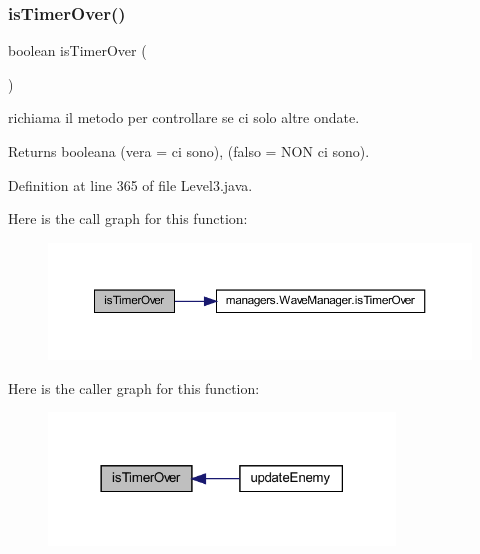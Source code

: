 \subsubsection{\texorpdfstring{is\+Timer\+Over()}{isTimerOver()}}
{\footnotesize\ttfamily boolean is\+Timer\+Over (\begin{DoxyParamCaption}{ }\end{DoxyParamCaption})\hspace{0.3cm}{\ttfamily [private]}}



richiama il metodo per controllare se ci solo altre ondate. 

\begin{DoxyReturn}{Returns}
booleana (vera = ci sono), (falso = N\+ON ci sono). 
\end{DoxyReturn}


Definition at line 365 of file Level3.\+java.

Here is the call graph for this function\+:\nopagebreak
\begin{figure}[H]
\begin{center}
\leavevmode
\includegraphics[width=350pt]{classscenes_1_1_level3_ab68417e6738c05037923f5f0f21eb586_cgraph}
\end{center}
\end{figure}
Here is the caller graph for this function\+:\nopagebreak
\begin{figure}[H]
\begin{center}
\leavevmode
\includegraphics[width=261pt]{classscenes_1_1_level3_ab68417e6738c05037923f5f0f21eb586_icgraph}
\end{center}
\end{figure}
\mbox{\label{classscenes_1_1_level3_aa12eb1084be2c4d9b03d5f248f00900d}} 
